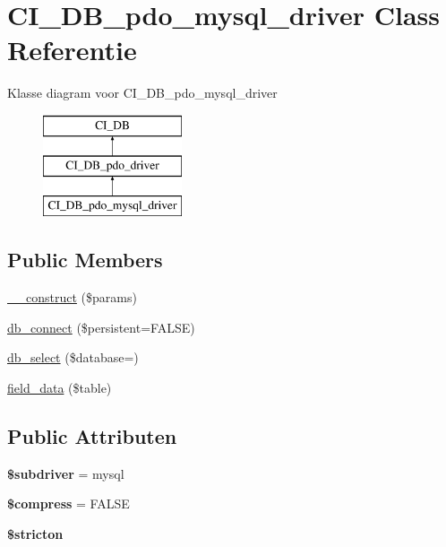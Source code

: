 \hypertarget{class_c_i___d_b__pdo__mysql__driver}{}\section{C\+I\+\_\+\+D\+B\+\_\+pdo\+\_\+mysql\+\_\+driver Class Referentie}
\label{class_c_i___d_b__pdo__mysql__driver}
Klasse diagram voor C\+I\+\_\+\+D\+B\+\_\+pdo\+\_\+mysql\+\_\+driver\begin{figure}[H]
\begin{center}
\leavevmode
\includegraphics[height=3.000000cm]{class_c_i___d_b__pdo__mysql__driver}
\end{center}
\end{figure}
\subsection*{Public Members}
\begin{DoxyCompactItemize}
\item 
\mbox{\hyperlink{class_c_i___d_b__pdo__mysql__driver_a9162320adff1a1a4afd7f2372f753a3e}{\+\_\+\+\_\+construct}} (\$params)
\item 
\mbox{\hyperlink{class_c_i___d_b__pdo__mysql__driver_a52bf595e79e96cc0a7c907a9b45aeb4d}{db\+\_\+connect}} (\$persistent=F\+A\+L\+SE)
\item 
\mbox{\hyperlink{class_c_i___d_b__pdo__mysql__driver_a18ae9c21870b30b45337c5e3626190cc}{db\+\_\+select}} (\$database=\textquotesingle{}\textquotesingle{})
\item 
\mbox{\hyperlink{class_c_i___d_b__pdo__mysql__driver_a90355121e1ed009e0efdbd544ab56efa}{field\+\_\+data}} (\$table)
\end{DoxyCompactItemize}
\subsection*{Public Attributen}
\begin{DoxyCompactItemize}
\item 
\mbox{\label{class_c_i___d_b__pdo__mysql__driver_a1322ca756348b11d080cb7a4f590de15}} 
{\bfseries \$subdriver} = \textquotesingle{}mysql\textquotesingle{}
\item 
\mbox{\label{class_c_i___d_b__pdo__mysql__driver_abf799de0d30288b91ee73769281dd69d}} 
{\bfseries \$compress} = F\+A\+L\+SE
\item 
\mbox{\label{class_c_i___d_b__pdo__mysql__driver_afb42d9811bec1da94506e5764e1439e0}} 
{\bfseries \$stricton}
\end{DoxyCompactItemize}
